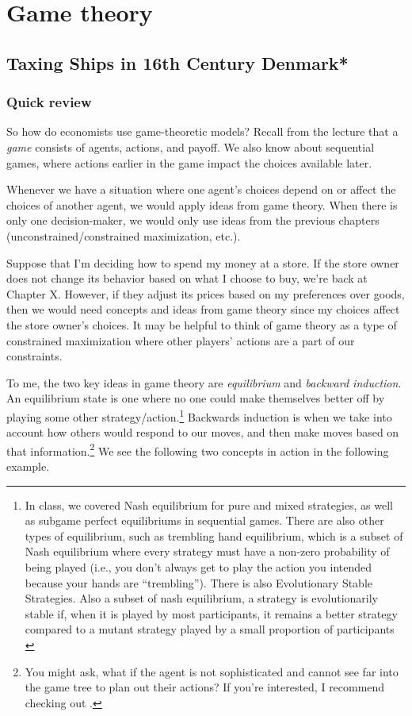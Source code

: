 \chapter{Game theory}
\section{Taxing Ships in 16th Century Denmark*}
\subsection*{Quick review}
So how do economists use game-theoretic models? Recall from the lecture that a \textit{game} consists of agents, actions, and payoff. We also know about sequential games, where actions earlier in the game impact the choices available later. 

Whenever we have a situation where one agent's choices depend on or affect the choices of another agent, we would apply ideas from game theory. When there is only one decision-maker, we would only use ideas from the previous chapters (unconstrained/constrained maximization, etc.). 

Suppose that I'm deciding how to spend my money at a store. If the store owner does not change its behavior based on what I choose to buy, we're back at Chapter X. However, if they adjust its prices based on my preferences over goods, then we would need concepts and ideas from game theory since my choices affect the store owner's choices. It may be helpful to think of game theory as a type of constrained maximization where other players' actions are a part of our constraints.

To me, the two key ideas in game theory are \textit{equilibrium} and \textit{backward induction}. An equilibrium state is one where no one could make themselves better off by playing some other strategy/action.\footnote{In class, we covered Nash equilibrium for pure and mixed strategies, as well as subgame perfect equilibriums in sequential games. There are also other types of equilibrium, such as trembling hand equilibrium, which is a subset of Nash equilibrium where every strategy must have a non-zero probability of being played (i.e., you don't always get to play the action you intended because your hands are ``trembling''). There is also Evolutionary Stable Strategies. Also a subset of nash equilibrium, a strategy is evolutionarily stable if, when it is played by most participants, it remains a better strategy compared to a mutant strategy played by a small proportion of participants \citep{Broom_2013_Gamerbio}} Backwards induction is when we take into account how others would respond to our moves, and then make moves based on that information.\footnote{You might ask, what if the agent is not sophisticated and cannot see far into the game tree to plan out their actions? If you're interested, I recommend checking out \citet{li_2017_OSP}.} We see the following two concepts in action in the following example.

